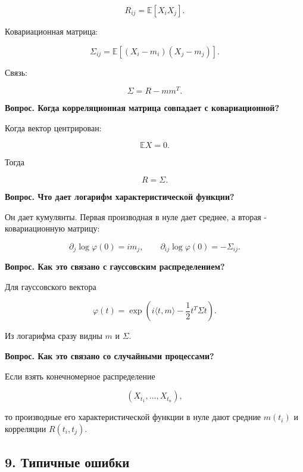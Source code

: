 \documentclass[
  11pt,
  a4paper,
]{article}
\begin{document}
\[
R_{ij}=\mathbb E[X_iX_j].
\]

Ковариационная матрица:

\[
\Sigma_{ij}=\mathbb E[(X_i-m_i)(X_j-m_j)].
\]

Связь:

\[
\Sigma=R-mm^T.
\]

\textbf{Вопрос. Когда корреляционная матрица совпадает с
ковариационной?}

Когда вектор центрирован:

\[
\mathbb EX=0.
\]

Тогда

\[
R=\Sigma.
\]

\textbf{Вопрос. Что дает логарифм характеристической функции?}

Он дает кумулянты. Первая производная в нуле дает среднее, а вторая -
ковариационную матрицу:

\[
\partial_j\log\varphi(0)=im_j,
\qquad
\partial_{ij}\log\varphi(0)=-\Sigma_{ij}.
\]

\textbf{Вопрос. Как это связано с гауссовским распределением?}

Для гауссовского вектора

\[
\varphi(t)=\exp\left(i\langle t,m\rangle-\frac12t^T\Sigma t\right).
\]

Из логарифма сразу видны \(m\) и \(\Sigma\).

\textbf{Вопрос. Как это связано со случайными процессами?}

Если взять конечномерное распределение

\[
(X_{t_1},\ldots,X_{t_n}),
\]

то производные его характеристической функции в нуле дают средние
\(m(t_i)\) и корреляции \(R(t_i,t_j)\).

\subsection{9. Типичные
ошибки}\label{ux442ux438ux43fux438ux447ux43dux44bux435-ux43eux448ux438ux431ux43aux438}
\end{document}
